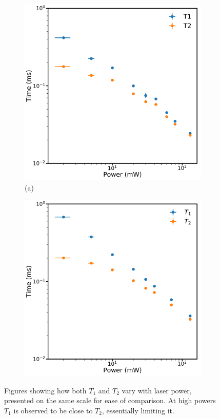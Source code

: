 \begin{figure}
\centering
\begin{subfigure}[b]{0.5\columnwidth}
\includegraphics[width = \columnwidth]{Figures/8kT1vsT21058.pdf}{(a)}
\end{subfigure}%
\begin{subfigure}[b]{0.5\columnwidth}
\includegraphics[width=\columnwidth]{Figures/T1vsT11070.pdf}
\end{subfigure}%
\caption[$T_1$ vs $T_2$ for 1058nm and 1070nm]{Figures showing how both $T_1$ and $T_2$ vary with laser power, presented on the same scale for ease of comparison. At high powers $T_1$ is observed to be close to $T_2$, essentially limiting it. }
\label{fig:t1vst2wav}
\end{figure}

